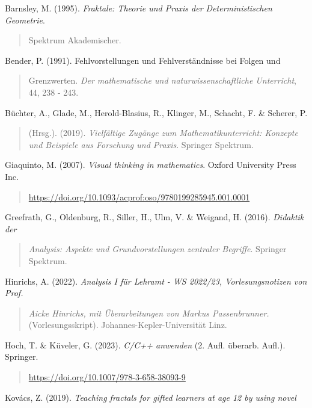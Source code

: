 \documentclass[a4paper, 12pt]{book}
\begin{document}
Barnsley, M. (1995). \emph{Fraktale: Theorie und Praxis der
Deterministischen Geometrie}.

\begin{quote}
Spektrum Akademischer.
\end{quote}

Bender, P. (1991). Fehlvorstellungen und Fehlverständnisse bei Folgen
und

\begin{quote}
Grenzwerten. \emph{Der mathematische und naturwissenschaftliche
Unterricht}, 44, 238 - 243.
\end{quote}

Büchter, A., Glade, M., Herold-Blasius, R., Klinger, M., Schacht, F. \&
Scherer, P.

\begin{quote}
(Hrsg.). (2019). \emph{Vielfältige Zugänge zum Mathematikunterricht:
Konzepte und Beispiele aus Forschung und Praxis}. Springer Spektrum.
\end{quote}

Giaquinto, M. (2007). \emph{Visual thinking in mathematics}. Oxford
University Press Inc.

\begin{quote}
\url{https://doi.org/10.1093/acprof:oso/9780199285945.001.0001}
\end{quote}

Greefrath, G., Oldenburg, R., Siller, H., Ulm, V. \& Weigand, H. (2016).
\emph{Didaktik der}

\begin{quote}
\emph{Analysis: Aspekte und Grundvorstellungen zentraler Begriffe}.
Springer Spektrum.
\end{quote}

Hinrichs, A. (2022). \emph{Analysis I für Lehramt - WS 2022/23,
Vorlesungsnotizen von Prof.}

\begin{quote}
\emph{Aicke Hinrichs, mit Überarbeitungen von Markus Passenbrunner.}
(Vorlesungsskript). Johannes-Kepler-Universität Linz.
\end{quote}

Hoch, T. \& Küveler, G. (2023). \emph{C/C++ anwenden} (2. Aufl. überarb.
Aufl.). Springer.

\begin{quote}
\url{https://doi.org/10.1007/978-3-658-38093-9}
\end{quote}

Kovács, Z. (2019). \emph{Teaching fractals for gifted learners at age 12
by using novel}
\end{document}
